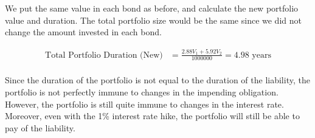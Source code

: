 \documentclass[a4paper]{article}
\begin{document}
\begin{enumerate}
    We put the same value in each bond as before, and calculate the new portfolio value and duration. The total portfolio size would be the same since we did not change the amount invested in each bond.

    \begin{align*}
        \text{Total Portfolio Duration (New)} &= \frac{2.88V_1 + 5.92V_2}{1000000} = 4.98 \text{ years} \\
    \end{align*}

    Since the duration of the portfolio is not equal to the duration of the liability, the portfolio is not perfectly immune to changes in the impending obligation. However, the portfolio is still quite immune to changes in the interest rate. Moreover, even with the 1\% interest rate hike, the portfolio will still be able to pay of the liability.



\end{enumerate}
\end{document}
